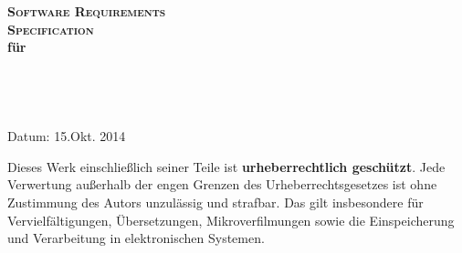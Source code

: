 \begin{titlepage}

\begin{flushright} 									%
\huge{\textbf{\textsc{Software Requirements}}}	%
\\
\huge{\textbf{\textsc{Specification}}}
\\[6ex]
\LARGE{\textbf{für}}							%
\\[6ex]					
\huge{\textbf{\project}}						%
\\[6ex]
\normalsize								%
\version										%
\\[5ex]
\autorFirst
\\[5ex]
\organisation
\\[5ex]
Datum: 15.Okt. 2014
\\[40ex]
\end{flushright}

\singlespacing						%
\small								%
\noindent							%
Dieses Werk einschließlich seiner Teile ist \textbf{urheberrechtlich geschützt}. Jede Verwertung außerhalb der engen Grenzen des Urheberrechtsgesetzes ist ohne Zustimmung des Autors unzulässig und strafbar. Das gilt insbesondere für Vervielfältigungen, Übersetzungen, Mikroverfilmungen sowie die Einspeicherung und Verarbeitung in elektronischen Systemen.

\end{titlepage}